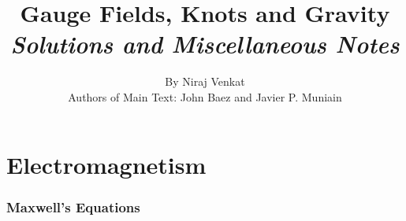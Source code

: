 \documentclass[10pt]{article}
\begin{document}
\nocite{*}

\title{{Gauge Fields, Knots and Gravity}\\{\normalsize{\itshape Solutions and Miscellaneous Notes}}}
\author{By Niraj Venkat\\Authors of Main Text: John Baez and Javier P. Muniain}
\maketitle
\newpage
\pagestyle{fancynotes}


\part{Electromagnetism}


\section{Maxwell's Equations}\label{b1c1}
\end{document}
